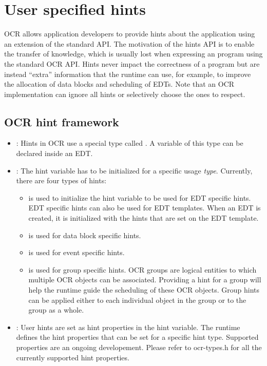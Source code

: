 \section{User specified hints}
OCR allows application developers to provide hints about the application using
an extension of the standard API. The motivation of the hints API is to enable
the transfer of knowledge, which is usually lost when expressing an program
using the standard OCR API. Hints never impact the correctness of a program but
are instead “extra” information that the runtime can use, for example, to
improve the allocation of data blocks and scheduling of EDTs. Note that an OCR
implementation can ignore all hints or selectively choose the ones to respect.

\subsection{OCR hint framework}
\begin{itemize}
\item \hypertarget{type_ocrHint_t}{}: Hints in OCR use a special
type called . A variable of this type can be declared inside an EDT.

\item \hypertarget{type_ocrHintType_t}{}: The hint variable
has to be initialized for a specific usage {\em type}. Currently, there are four
types of hints:
\begin{itemize}
\item {} is used to initialize the hint variable to be
used for EDT specific hints. EDT specific hints can also be used for EDT
templates. When an EDT is created, it is initialized with the hints that are
set on the EDT template.
\item {} is used for data block specific hints.
\item {} is used for event specific hints.
\item {} is used for group specific hints.
OCR groups are logical entities to which multiple OCR objects can be associated.
Providing a hint for a group will help the runtime guide the scheduling of these
OCR objects. Group hints can be applied either to each individual object in the
group or to the group as a whole.
\end{itemize}

\item \hypertarget{type_ocrHintProp_t}{}: User hints are
set as hint properties in the hint variable. The runtime defines the hint
properties that can be set for a specific hint type. Supported properties are
an ongoing developement. Please refer to ocr-types.h for all the currently
supported hint properties.
\end{itemize}

